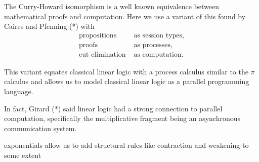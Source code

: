 The Curry-Howard isomorphism is a well known equivalence between mathematical proofs and computation. Here 
we use a variant of this found by Caires and Pfenning (*) with 
\begin{align*}
    \text{propositions }& \text{as session types,} \\
    \text{proofs } & \text{as processes,} \\
    \text{cut elimination } & \text{as computation.} 
\end{align*}

This variant equates classical linear logic with a process calculus similar 
to the $\pi$ calculus and allows us to model classical linear logic as a parallel programming language. 


In fact, Girard (*) said linear logic had a strong connection to parallel computation, 
specifically the multiplicative fragment being an asynchronous communication system.

exponentials allow us to add structural rules like contraction and weakening to some extent



 


